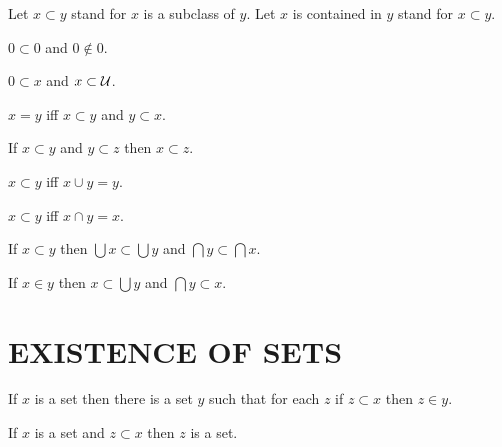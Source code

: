 \documentclass[a4paper,draft]{amsproc}
\begin{document}
\begin{forthel}
Let $x \subset y$ stand for $x$ is a subclass of $y$.
Let $x$ is contained in $y$ stand for $x \subset y$.

\begin{lemma}
$0 \subset 0$ and $0 \notin 0$.
\end{lemma}

\begin{theorem}
$0 \subset x$ and $x \subset \cal{U}$.
\end{theorem}

\begin{theorem}
$x = y$ iff $x \subset y$ and $y \subset x$.
\end{theorem}

\begin{theorem}
If $x \subset y$ and $y \subset z$ then $x \subset z$.
\end{theorem}

\begin{theorem}
$x \subset y$ iff $x \cup y = y$.
\end{theorem}

\begin{theorem}
$x \subset y$ iff $x \cap y = x$.
\end{theorem}

\begin{theorem}
If $x \subset y$ then $\bigcup x \subset \bigcup y$
and $\bigcap y \subset \bigcap x$.
\end{theorem}

\begin{theorem}
If $x \in y$ then $x \subset \bigcup y$ 
and $\bigcap y \subset x$.
\end{theorem}

\section{EXISTENCE OF SETS}

\begin{axiom}
If $x$ is a set then there is a set $y$ such that for each
$z$ if $z \subset x$ then $z \in y$.
\end{axiom}


\begin{theorem}
If $x$ is a set and $z \subset x$ then $z$ is a set.
\end{theorem}


\end{forthel}
\end{document}
